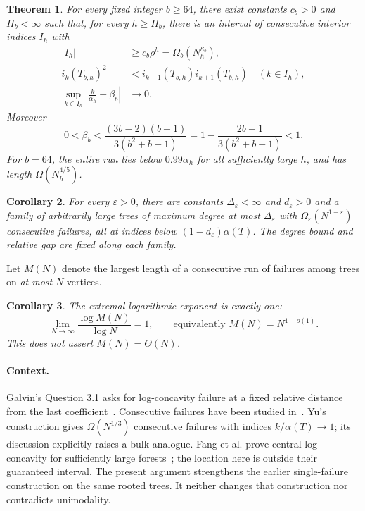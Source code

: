 \documentclass[11pt]{article}
\newtheorem{theorem}{Theorem}
\newtheorem{corollary}[theorem]{Corollary}
\begin{document}
\begin{theorem}\label{thm:main}
For every fixed integer $b\ge64$, there exist constants $c_b>0$ and
$H_b<\infty$ such that, for every $h\ge H_b$, there is an interval of
consecutive interior indices $I_h$ with
\begin{align}
 |I_h|&\ge c_b\rho^h=\Omega_b(N_h^{\kappa_b}),\label{eq:run}\\
 i_k(T_{b,h})^2&<i_{k-1}(T_{b,h})i_{k+1}(T_{b,h})
 \quad(k\in I_h),\label{eq:failure}\\
 \sup_{k\in I_h}\left|\frac{k}{\alpha_h}-\beta_b\right|&\longrightarrow0.
 \label{eq:location}
\end{align}
Moreover
\begin{equation}\label{eq:gap}
 0<\beta_b<\frac{(3b-2)(b+1)}{3(b^2+b-1)}
 =1-\frac{2b-1}{3(b^2+b-1)}<1.
\end{equation}
For $b=64$, the entire run lies below $0.99\alpha_h$ for all sufficiently
large $h$, and has length $\Omega(N_h^{4/5})$.
\end{theorem}

\begin{corollary}\label{cor:epsilon}
For every $\varepsilon>0$, there are constants $\Delta_\varepsilon<\infty$
and $d_\varepsilon>0$ and a family of arbitrarily large trees of maximum
degree at most $\Delta_\varepsilon$ with $\Omega_\varepsilon(N^{1-\varepsilon})$
consecutive failures, all at indices below $(1-d_\varepsilon)\alpha(T)$.
The degree bound and relative gap are fixed along each family.
\end{corollary}

Let $M(N)$ denote the largest length of a consecutive run of failures
among trees on \emph{at most} $N$ vertices.
\begin{corollary}\label{cor:exponent}
The extremal logarithmic exponent is exactly one:
\[
 \lim_{N\to\infty}\frac{\log M(N)}{\log N}=1,
 \qquad\text{equivalently }M(N)=N^{1-o(1)}.
\]
This does not assert $M(N)=\Theta(N)$.
\end{corollary}

\paragraph{Context.}
Galvin's Question 3.1 asks for log-concavity failure at a fixed relative
distance from the last coefficient~\cite{Galvin}. Consecutive failures
have been studied in~\cite{Ramos,Yu}. Yu's construction gives
$\Omega(N^{1/3})$ consecutive failures with indices $k/\alpha(T)\to1$;
its discussion explicitly raises a bulk analogue. Fang et al. prove
central log-concavity for sufficiently large forests~\cite{Fang}; the
location here is outside their guaranteed interval. The present argument
strengthens the earlier single-failure construction on the same rooted
trees. It neither changes that construction nor contradicts unimodality.
\end{document}
